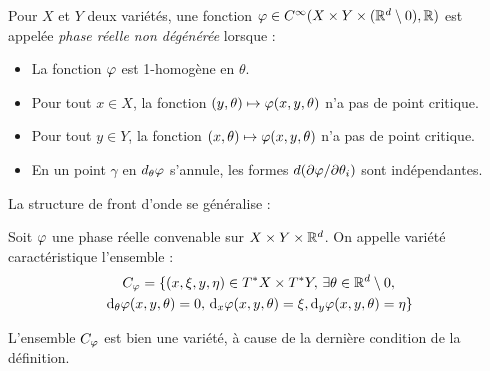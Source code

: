 \begin{defn}
  Pour $X$ et $Y$ deux variétés, une fonction $\varphi \in C^{\infty}(X \times Y \times (\mathbb{R}^d\setminus 0),\mathbb{R})$ est appelée \emph{phase réelle non dégénérée} lorsque :
  \begin{itemize}
    \item La fonction $\varphi$ est 1-homogène en $\theta$.
    \item Pour tout $x\in X$, la fonction $(y,\theta)\mapsto \varphi(x,y,\theta)$ n'a pas de point critique.
    \item Pour tout $y\in Y$, la fonction $(x,\theta)\mapsto \varphi(x,y,\theta)$ n'a pas de point critique.
    \item En un point $\gamma$ en $d_{\theta}\varphi$ s'annule, les formes $d(\partial \varphi/\partial \theta_i)$ sont indépendantes.
  \end{itemize}
\end{defn}

La structure de front d'onde se généralise :

\begin{defn}Soit $\varphi$ une phase réelle convenable sur $X\times Y\times \mathbb{R}^d$. On appelle variété caractéristique l'ensemble :
\begin{multline*}
    C_{\varphi}=\{(x,\xi,y,\eta) \in T^*X \times T^*Y,\,\exists \theta\in \mathbb{R}^d\setminus 0,\,\\\mathrm{d}_{\theta}\varphi(x,y,\theta)=0,\,\mathrm{d}_x\varphi(x,y,\theta)=\xi, \mathrm{d}_y\varphi(x,y,\theta)=\eta\}
\end{multline*}  
\end{defn}
\begin{rem}
	L'ensemble $C_{\varphi}$ est bien une variété, à cause de la dernière condition de la définition.
\end{rem}

